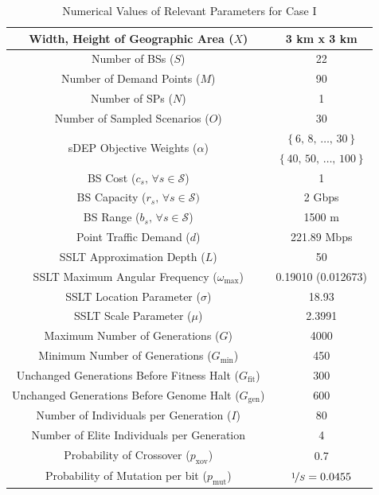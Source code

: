 \documentclass[12pt,dvipsnames]{report}
\begin{document}
\begin{table}[!htp]
	\centering
	\caption{Numerical Values of Relevant Parameters for Case I}
	\begin{tabular}{|c|c|} 
	\hline
		Width, Height of Geographic Area ($X$) & 3 km x 3 km \\
		\hline
		Number of BSs ($S$) & 22 \\ 
		\hline 
		Number of Demand Points ($M$) & 90 \\ 
		\hline 
		Number of SPs ($N$) & 1 \\
		\hline
		Number of Sampled Scenarios ($O$) & 30 \\ 
		\hline 
		\multirow{2}{*}{sDEP Objective Weights ($\alpha$)} & $\left\{ 6,\, 8,\, \ldots,\, 30 \right\}$ \\
		& $\left\{ 40,\, 50,\, \ldots,\, 100 \right\}$ \\
		\hline
		BS Cost ($c_s,\, \forall s \in \mathcal{S}$) & 1 \\ 
		\hline 
		BS Capacity ($r_s,\, \forall s \in \mathcal{S})$ & 2 Gbps \\ 
		\hline
		BS Range ($b_s,\, \forall s \in \mathcal{S}$) & 1500 m \\
		\hline 
		Point Traffic Demand ($d$) & 221.89 Mbps \\ 
		\hline 
		\hline
		SSLT Approximation Depth ($L$) & 50 \\ 
		\hline
		SSLT Maximum Angular Frequency ($\omega_{\max}$) & 0.19010 (0.012673) \\
		\hline 
		SSLT Location Parameter ($\sigma$) & 18.93 \\ 
		\hline 
		SSLT Scale Parameter ($\mu$) & 2.3991 \\ 
		\hline 
		\hline
		Maximum Number of Generations ($G$) & 4000 \\ 
		\hline
		Minimum Number of Generations ($G_{\min}$) & 450 \\
		\hline
		Unchanged Generations Before Fitness Halt ($G_{\text{fit}}$) & 300 \\
		\hline 
		Unchanged Generations Before Genome Halt ($G_{\text{gen}}$) & 600 \\
		\hline 
		Number of Individuals per Generation ($I$) & 80 \\ 
		\hline
		Number of Elite Individuals per Generation & 4 \\
		\hline 
		Probability of Crossover ($p_\text{xov}$) & 0.7 \\ 
		\hline
		Probability of Mutation per bit ($p_\text{mut}$) & $\nicefrac{1}{S} = 0.0455$ \\

\end{tabular}
\end{table}
\end{document}
